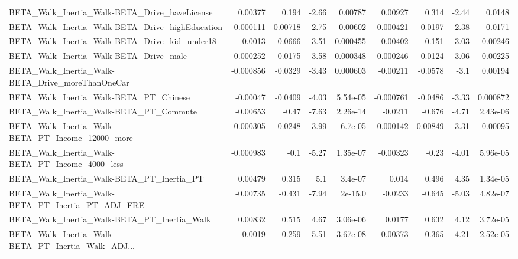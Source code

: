 \begin{tabular}{lrrrrrrrr}
BETA\_Walk\_Inertia\_Walk-BETA\_Drive\_haveLicense      &     0.00377 &        0.194 &    -2.66 &  0.00787 &    0.00927 &       0.314 &        -2.44 &        0.0148 \\
BETA\_Walk\_Inertia\_Walk-BETA\_Drive\_highEducation    &    0.000111 &      0.00718 &    -2.75 &  0.00602 &   0.000421 &      0.0197 &        -2.38 &        0.0171 \\
BETA\_Walk\_Inertia\_Walk-BETA\_Drive\_kid\_under18      &     -0.0013 &      -0.0666 &    -3.51 & 0.000455 &   -0.00402 &      -0.151 &        -3.03 &       0.00246 \\
BETA\_Walk\_Inertia\_Walk-BETA\_Drive\_male             &    0.000252 &       0.0175 &    -3.58 & 0.000348 &   0.000246 &      0.0124 &        -3.06 &       0.00225 \\
BETA\_Walk\_Inertia\_Walk-BETA\_Drive\_moreThanOneCar   &   -0.000856 &      -0.0329 &    -3.43 & 0.000603 &   -0.00211 &     -0.0578 &         -3.1 &       0.00194 \\
BETA\_Walk\_Inertia\_Walk-BETA\_PT\_Chinese             &    -0.00047 &      -0.0409 &    -4.03 & 5.54e-05 &  -0.000761 &     -0.0486 &        -3.33 &      0.000872 \\
BETA\_Walk\_Inertia\_Walk-BETA\_PT\_Commute             &    -0.00653 &        -0.47 &    -7.63 & 2.26e-14 &    -0.0211 &      -0.676 &        -4.71 &      2.43e-06 \\
BETA\_Walk\_Inertia\_Walk-BETA\_PT\_Income\_12000\_more   &    0.000305 &       0.0248 &    -3.99 &  6.7e-05 &   0.000142 &     0.00849 &        -3.31 &       0.00095 \\
BETA\_Walk\_Inertia\_Walk-BETA\_PT\_Income\_4000\_less    &   -0.000983 &         -0.1 &    -5.27 & 1.35e-07 &   -0.00323 &       -0.23 &        -4.01 &      5.96e-05 \\
BETA\_Walk\_Inertia\_Walk-BETA\_PT\_Inertia\_PT          &     0.00479 &        0.315 &      5.1 &  3.4e-07 &      0.014 &       0.496 &         4.35 &      1.34e-05 \\
BETA\_Walk\_Inertia\_Walk-BETA\_PT\_Inertia\_PT\_ADJ\_FRE  &    -0.00735 &       -0.431 &    -7.94 &  2e-15.0 &    -0.0233 &      -0.645 &        -5.03 &      4.82e-07 \\
BETA\_Walk\_Inertia\_Walk-BETA\_PT\_Inertia\_Walk        &     0.00832 &        0.515 &     4.67 & 3.06e-06 &     0.0177 &       0.632 &         4.12 &      3.72e-05 \\
BETA\_Walk\_Inertia\_Walk-BETA\_PT\_Inertia\_Walk\_ADJ... &     -0.0019 &       -0.259 &    -5.51 & 3.67e-08 &   -0.00373 &      -0.365 &        -4.21 &      2.52e-05 \\

\end{tabular}

